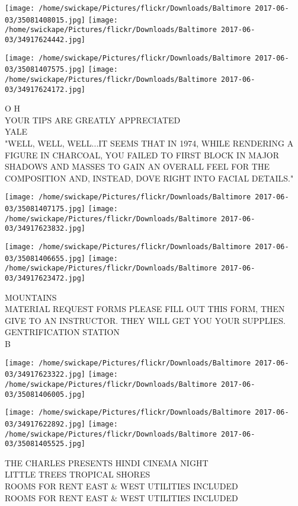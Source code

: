 \documentclass[10pt,letterpaper]{article}
\begin{document}
\texttt{[image: /home/swickape/Pictures/flickr/Downloads/Baltimore 2017-06-03/35081408015.jpg]}
\texttt{[image: /home/swickape/Pictures/flickr/Downloads/Baltimore 2017-06-03/34917624442.jpg]}

\texttt{[image: /home/swickape/Pictures/flickr/Downloads/Baltimore 2017-06-03/35081407575.jpg]}
\texttt{[image: /home/swickape/Pictures/flickr/Downloads/Baltimore 2017-06-03/34917624172.jpg]}

O H\\
YOUR TIPS ARE GREATLY APPRECIATED\\
YALE\\
"WELL, WELL, WELL...IT SEEMS THAT IN 1974, WHILE RENDERING A FIGURE IN CHARCOAL, YOU FAILED TO FIRST BLOCK IN MAJOR SHADOWS AND MASSES TO GAIN AN OVERALL FEEL FOR THE COMPOSITION AND, INSTEAD, DOVE RIGHT INTO FACIAL DETAILS."\\
\pagebreak

\texttt{[image: /home/swickape/Pictures/flickr/Downloads/Baltimore 2017-06-03/35081407175.jpg]}
\texttt{[image: /home/swickape/Pictures/flickr/Downloads/Baltimore 2017-06-03/34917623832.jpg]}

\texttt{[image: /home/swickape/Pictures/flickr/Downloads/Baltimore 2017-06-03/35081406655.jpg]}
\texttt{[image: /home/swickape/Pictures/flickr/Downloads/Baltimore 2017-06-03/34917623472.jpg]}

MOUNTAINS\\
MATERIAL REQUEST FORMS PLEASE FILL OUT THIS FORM, THEN GIVE TO AN INSTRUCTOR.  THEY WILL GET YOU YOUR SUPPLIES.\\
GENTRIFICATION STATION\\
B\\
\pagebreak

\texttt{[image: /home/swickape/Pictures/flickr/Downloads/Baltimore 2017-06-03/34917623322.jpg]}
\texttt{[image: /home/swickape/Pictures/flickr/Downloads/Baltimore 2017-06-03/35081406005.jpg]}

\texttt{[image: /home/swickape/Pictures/flickr/Downloads/Baltimore 2017-06-03/34917622892.jpg]}
\texttt{[image: /home/swickape/Pictures/flickr/Downloads/Baltimore 2017-06-03/35081405525.jpg]}

THE CHARLES PRESENTS HINDI CINEMA NIGHT\\
LITTLE TREES TROPICAL SHORES\\
ROOMS FOR RENT EAST \& WEST UTILITIES INCLUDED\\
ROOMS FOR RENT EAST \& WEST UTILITIES INCLUDED\\
\pagebreak
\end{document}
